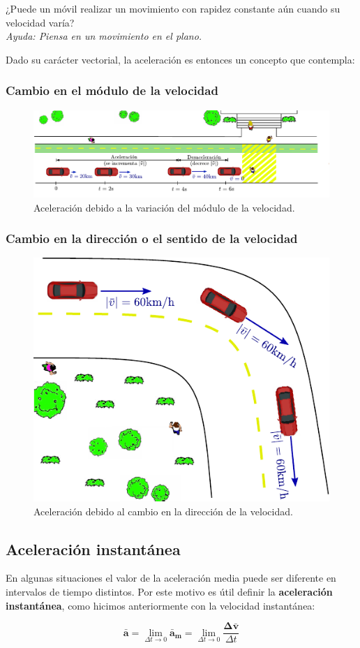 \begin{comprension}
¿Puede un móvil realizar un movimiento con rapidez constante aún cuando su velocidad varía?\\
{\em Ayuda: Piensa en un movimiento en el plano.}
\end{comprension}


Dado su carácter vectorial, la aceleración es entonces un concepto que contempla:

\subsubsection{Cambio en el módulo de la velocidad}

\begin{figure}[H]
\centering
 \includegraphics[width=1.1\textwidth]{img/auto1.pdf}
 \caption{Aceleración debido a la variación del módulo de la velocidad.}
\end{figure}

\subsubsection{Cambio en la dirección o el sentido de la velocidad}

\begin{figure}[H]
\centering
 \includegraphics[width=.5\textwidth]{img/auto2.pdf}
 \caption{Aceleración debido al cambio en la dirección de la velocidad.}
\end{figure}


\subsection{Aceleración instantánea}

En algunas situaciones el valor de la aceleración media puede ser diferente en intervalos de tiempo distintos. Por este motivo es útil definir la {\bf aceleración instantánea}, como hicimos anteriormente con la velocidad instantánea:


$$\mathbold{\bar{a}}= \lim_{\Delta t \rightarrow 0} \mathbold{\bar{a}_m} = \lim_{\Delta t \rightarrow 0} \frac{\mathbold{\Delta \bar{v}}}{\Delta t}$$